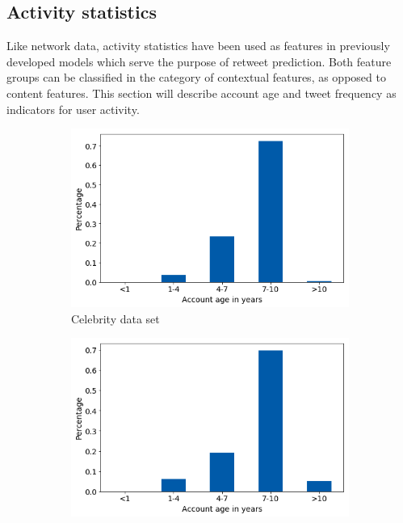 \subsection{Activity statistics}
\label{sec:activity_stats}

Like network data, activity statistics have been used as features in previously
developed models which serve the purpose of retweet prediction.
Both feature groups can be classified in the category of contextual features,
as opposed to content features.
This section will describe account age and tweet frequency as indicators
for user activity.

\begin{figure}[h]
\centering
\begin{subfigure}{.33\textwidth}
  \centering
  \includegraphics[width=.95\linewidth]{img/celeb_age_distr}
  \caption{Celebrity data set}
  \label{fig:age_distr_sub1}
\end{subfigure}%
\begin{subfigure}{.33\textwidth}
  \centering
  \includegraphics[width=.95\linewidth]{img/polit_age_distr}

\end{subfigure}
\end{figure}
